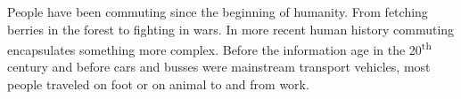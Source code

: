 People have been commuting since the beginning of humanity.
From fetching berries in the forest to fighting in wars.
In more recent human history commuting encapsulates something more complex.
Before the information age in the 20\textsuperscript{th} century and before cars and busses were mainstream transport vehicles, most people traveled on foot or on animal to and from work.
